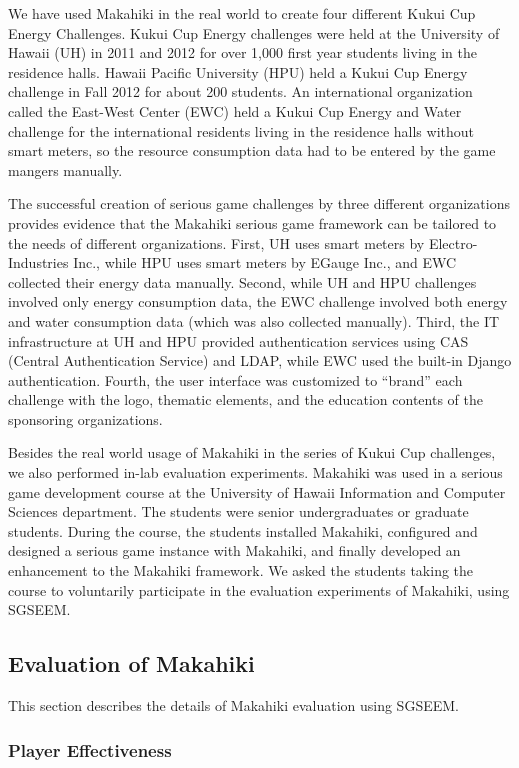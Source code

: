 \documentclass{sigchi}
\begin{document}
We have used Makahiki in the real world to create four different Kukui
Cup Energy Challenges. Kukui Cup Energy challenges were held at the
University of Hawaii (UH) in 2011 and 2012 for over 1,000 first
year students living in the residence halls. Hawaii Pacific University
(HPU) held a Kukui Cup Energy challenge in Fall 2012 for about 200
students. An international organization called the East-West Center
(EWC) held a Kukui Cup Energy and Water challenge for the
international residents living in the residence halls without smart
meters, so the resource consumption data had to be entered by the game
mangers manually.

The successful creation of serious game challenges by three different
organizations provides evidence that the Makahiki serious game framework
can be tailored to the needs of different organizations. First, UH uses
smart meters by Electro-Industries Inc., while HPU uses smart meters by
EGauge Inc., and EWC collected their energy data manually. Second, while
UH and HPU challenges involved only energy consumption data, the EWC
challenge involved both energy and water consumption data (which was
also collected manually). Third, the IT infrastructure at UH and HPU
provided authentication services using CAS (Central Authentication
Service) and LDAP, while EWC used the built-in Django authentication.
Fourth, the user interface was customized to ``brand'' each challenge
with the logo, thematic elements, and the education contents of the
sponsoring organizations.

Besides the real world usage of Makahiki in the series of Kukui Cup
challenges, we also performed in-lab evaluation experiments. Makahiki
was used in a serious game development course at the University of
Hawaii Information and Computer Sciences department. The students were senior undergraduates or graduate students. During the course, the students 
installed Makahiki, configured and designed a serious game instance with
Makahiki, and finally developed an enhancement to the Makahiki
framework. We asked the students taking the course to voluntarily
participate in the evaluation experiments of Makahiki, using SGSEEM.

\subsection{Evaluation of Makahiki}

This section describes the details of Makahiki evaluation using SGSEEM.

\subsubsection{Player Effectiveness}
\end{document}
